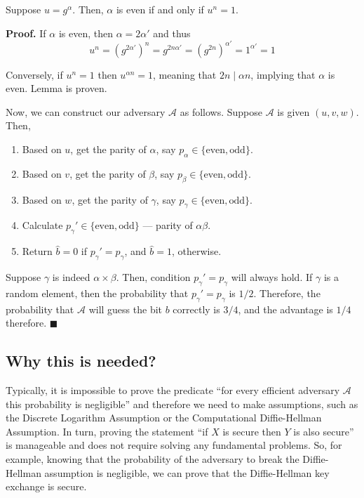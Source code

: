 \documentclass[../lecture-notes.tex]{subfiles}
\begin{document}
\begin{lemma}
    Suppose $u=g^{\alpha}$. Then, $\alpha$ is even if and only if $u^n = 1$.
\end{lemma}

\textbf{Proof.} If $\alpha$ is even, then $\alpha = 2\alpha'$ and thus
\begin{equation}
    u^n = (g^{2\alpha'})^n = g^{2n\alpha'} = (g^{2n})^{\alpha'} = 1^{\alpha'} = 1
\end{equation}

Conversely, if $u^n = 1$ then $u^{\alpha n}=1$, meaning that $2n \mid \alpha n$, implying that $\alpha$ is even. Lemma is proven.

Now, we can construct our adversary $\mathcal{A}$ as follows. Suppose $\mathcal{A}$ is given $(u,v,w)$. Then,
\begin{enumerate}
    \item Based on $u$, get the parity of $\alpha$, say $p_{\alpha} \in \{\text{even}, \text{odd}\}$.
    \item Based on $v$, get the parity of $\beta$, say $p_{\beta} \in \{\text{even}, \text{odd}\}$.
    \item Based on $w$, get the parity of $\gamma$, say $p_{\gamma} \in \{\text{even}, \text{odd}\}$.
    \item Calculate $p_{\gamma}'\in \{\text{even}, \text{odd}\}$ --- parity of $\alpha\beta$.
    \item Return $\hat{b}=0$ if $p_{\gamma}' = p_{\gamma}$, and $\hat{b}=1$, otherwise.
\end{enumerate}

Suppose $\gamma$ is indeed $\alpha \times \beta$. Then, condition $p_{\gamma}'=p_{\gamma}$ will always hold. If $\gamma$ is a random element, then the probability that $p_{\gamma}'=p_{\gamma}$ is $1/2$. Therefore, the probability that $\mathcal{A}$ will guess the bit $b$ correctly is $3/4$, and the advantage is $1/4$ therefore. $\blacksquare$

\subsection{Why this is needed?}

Typically, it is impossible to prove the predicate ``for every efficient adversary $\mathcal{A}$ this probability is negligible'' and therefore we need to make assumptions, such as the Discrete Logarithm Assumption or the Computational Diffie-Hellman Assumption. In turn, proving the statement ``if $X$ is secure then $Y$ is also secure'' is manageable and does not require solving any fundamental problems. So, for example,
knowing that the probability of the adversary to break the Diffie-Hellman assumption is negligible, we can prove that the Diffie-Hellman key exchange is secure. 
\end{document}
